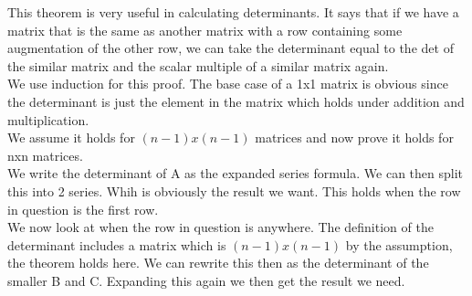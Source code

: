 \documentclass[12pt]{article}
\begin{document}
\begin{explanation}{}
    This theorem is very useful in calculating determinants. It says that if we have a matrix that is the same as another matrix with a row containing some augmentation of the other row, we can take the determinant equal to the det of the similar matrix and the scalar multiple of a similar matrix again.\\
We use induction for this proof. The base case of a 1x1 matrix is obvious since the determinant is just the element in the matrix which holds under addition and multiplication.\\
We assume it holds for $(n-1)x(n-1)$ matrices and now prove it holds for nxn matrices.\\
We write the determinant of A as the expanded series formula. We can then split this into 2 series. Whih is obviously the result we want. This holds when the row in question is the first row.\\
We now look at when the row in question is anywhere. The definition of the determinant includes a matrix which is $(n-1)x(n-1)$ by the assumption, the theorem holds here. We can rewrite this then as the determinant of the smaller B and C. Expanding this again we then get the result we need.\\
\end{explanation}

\newpage
\end{document}
